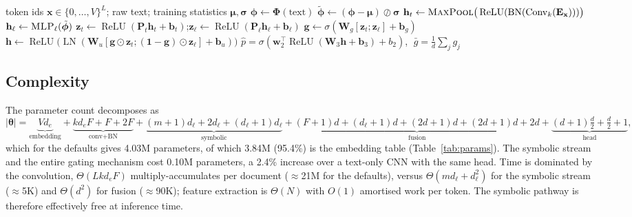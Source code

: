 \begin{algorithm}[t]
\caption{\menet{} forward pass for one document}
\label{alg:forward}
\begin{algorithmic}[1]
\Require token ids $\mathbf{x}\in\{0,\dots,V\}^{L}$; raw text; training statistics $\bm{\mu},\bm{\sigma}$
\State $\bm{\phi}\gets\bm{\Phi}(\text{text})$ 
\State $\tilde{\bm{\phi}}\gets(\bm{\phi}-\bm{\mu})\oslash\bm{\sigma}$
\State $\mathbf{h}_t\gets\textsc{MaxPool}\big(\operatorname{ReLU}(\operatorname{BN}(\operatorname{Conv}_k(\mathbf{E}_{\mathbf{x}})))\big)$ 
\State $\mathbf{h}_\ell\gets\textsc{MLP}_\ell(\tilde{\bm{\phi}})$
\State $\mathbf{z}_t\gets\operatorname{ReLU}(\mathbf{P}_t\mathbf{h}_t+\mathbf{b}_t)$;\quad $\mathbf{z}_\ell\gets\operatorname{ReLU}(\mathbf{P}_\ell\mathbf{h}_\ell+\mathbf{b}_\ell)$
\State $\mathbf{g}\gets\sigma(\mathbf{W}_g[\mathbf{z}_t;\mathbf{z}_\ell]+\mathbf{b}_g)$ 
\State $\mathbf{h}\gets\operatorname{ReLU}\big(\operatorname{LN}(\mathbf{W}_u[\mathbf{g}\odot\mathbf{z}_t;(\mathbf{1}-\mathbf{g})\odot\mathbf{z}_\ell]+\mathbf{b}_u)\big)$
\State \Return $\hat p=\sigma(\mathbf{w}_2^{\top}\operatorname{ReLU}(\mathbf{W}_3\mathbf{h}+\mathbf{b}_3)+b_2)$, $\;\bar g=\tfrac1d\sum_j g_j$
\end{algorithmic}
\end{algorithm}

\subsection{Complexity}
\label{sec:complexity}

The parameter count decomposes as
\begin{equation}
|\bm{\theta}|=\underbrace{Vd_e}_{\text{embedding}}+\underbrace{kd_eF+F+2F}_{\text{conv}+\text{BN}}
+\underbrace{(m+1)d_\ell+2d_\ell+(d_\ell+1)d_\ell}_{\text{symbolic}}
+\underbrace{(F{+}1)d+(d_\ell{+}1)d+(2d{+}1)d+(2d{+}1)d+2d}_{\text{fusion}}
+\underbrace{(d{+}1)\tfrac d2+\tfrac d2+1}_{\text{head}},
\end{equation}
which for the defaults gives 4.03M parameters, of which 3.84M (95.4\%) is the embedding table
(Table~\ref{tab:params}). The symbolic stream and the entire gating mechanism cost 0.10M parameters, a
2.4\% increase over a text-only CNN with the same head. Time is dominated by the convolution,
$\Theta(Lkd_eF)$ multiply-accumulates per document ($\approx$21M for the defaults), versus
$\Theta(md_\ell+d_\ell^2)$ for the symbolic stream ($\approx$5K) and $\Theta(d^2)$ for fusion
($\approx$90K); feature extraction is $\Theta(N)$ with $O(1)$ amortised work per token. The symbolic
pathway is therefore effectively free at inference time.


